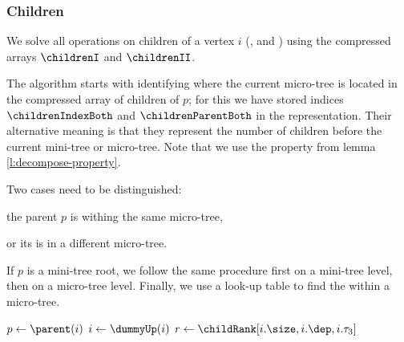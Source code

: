 \subsubsection{Children}

We solve all operations on children of a vertex $i$ (\degree{}, \childRank{} and \childSelect{}) using the compressed arrays $\childrenI$ and $\childrenII$.

\begin{algorithm}
\begin{algorithmic}
		\State {}
		\State {}
	\Else
		\State {}
	\EndIf
\EndFunction
\end{algorithmic}
\end{algorithm}

The \childRank{} algorithm starts with  identifying where the current micro-tree is located in the compressed array of children of $p$; for this we have stored indices $\childrenIndexBoth$ and $\childrenParentBoth$ in the representation.
Their alternative meaning is that they represent the number of children before the current mini-tree or micro-tree.
Note that we use the property from lemma \ref{l:decompose-property}.

Two cases need to be distinguished:
\begin{enuminline}
	\item the parent $p$ is withing the same micro-tree,
	\item or its is in a different micro-tree.
\end{enuminline}
If $p$ is a mini-tree root, we follow the same procedure first on a mini-tree level, then on a micro-tree level.
Finally, we use a look-up table to find the \childRank{} within a micro-tree.

\begin{algorithm}
\begin{algorithmic}
	\State $p \gets \parent(i)$
	\State $i \gets \dummyUp(i)$ 
		\State {}
		 
			\State {}
		\Else {}
			\State {}
		\EndIf
		 
			 
				\State $r \gets \childRank[i.\size, i.\dep, i.\tau_3]$
				\State {}
			\Else {}
				\State {}
			\EndIf
		\Else {}
			\State {}
		\EndIf
	\Else
		\State {}
	\EndIf
\EndFunction
\end{algorithmic}
\end{algorithm}

